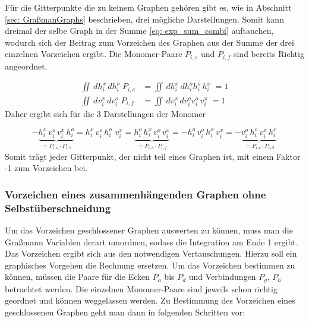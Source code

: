Für die Gitterpunkte die zu keinem Graphen gehören gibt es, wie in Abschnitt \ref{sec: GraßmanGraphs} beschrieben, drei mögliche Darstellungen. Somit kann dreimal der selbe Graph in der Summe \eqref{eq: exp_sum_combi} auftauchen, wodurch sich der Beitrag zum Vorzeichen des Graphen aus der Summe der drei einzelnen Vorzeichen ergibt. Die Monomer-Paare $P_{i,e}$ und $P_{i,f}$ sind bereits Richtig angeordnet. 

\begin{align}
\iint \,dh_{i}^x\,dh_{i}^o \; P_{i,e} &= \iint \,dh_{i}^x\,dh_{i}^o h_{i}^o\,h_{i}^x\;  = 1\\
\iint \,dv_{i}^x\,dv_{i}^o \; P_{i,f} &= \iint \,dv_{i}^x\,dv_{i}^o v_{i}^o\,v_{i}^x\;  = 1
\end{align} Daher ergibt sich für die 3 Darstellungen der Monomer

\begin{equation}
-\underbrace{h_{i}^x\, v_{i}^o \,v_{i}^x\,h_{i}^o}_{= P_{i,a}\cdot P_{i,b}} 
= h_{i}^x\, v_{i}^o\, h_{i}^o\,\,v_{i}^x 
= \underbrace{h_{i}^o\,h_{i}^x\, v_{i}^o\,v_{i}^x }_{= P_{i,e}\cdot P_{i,f}}= - h_{i}^o\,v_{i}^o\,h_{i}^x\,v_{i}^x 
= -\underbrace{v_{i}^o\,h_{i}^o\,v_{i}^x\,h_{i}^x}_{= P_{i,c}\cdot P_{i,d}}
\end{equation} Somit trägt jeder Gitterpunkt, der nicht teil eines Graphen ist, mit einem Faktor -1 zum Vorzeichen bei.

\subsubsection{Vorzeichen eines zusammenhängenden Graphen ohne Selbstüberschneidung}

Um das Vorzeichen geschlossener Graphen auswerten zu können, muss man die Graßmann Variablen derart umordnen, sodass die Integration am Ende 1 ergibt. Das Vorzeichen ergibt sich aus den notwendigen Vertauschungen. Hierzu soll ein graphisches Vorgehen die Rechnung ersetzen. Um das Vorzeichen bestimmen zu können, müssen die Paare für die Ecken $P_a$ bis $P_d$ und Verbindungen $P_g$, $P_h$ betrachtet werden. Die einzelnen Monomer-Paare sind jeweils schon richtig geordnet und können weggelassen werden. Zu Bestimmung des Vorzeichen eines geschlossenen Graphen geht man dann in folgenden Schritten vor:

